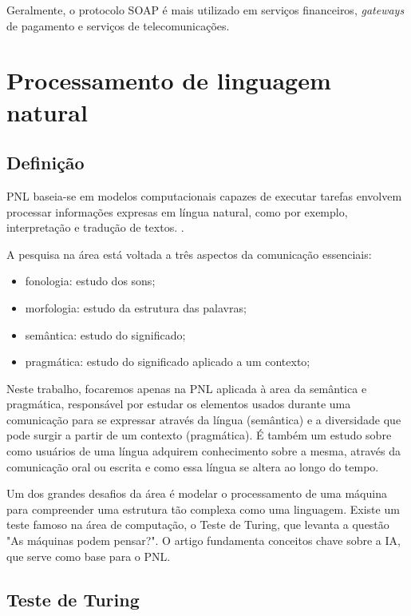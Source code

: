 Geralmente, o protocolo SOAP é mais utilizado em serviços financeiros, \textit{gateways} de pagamento e serviços de telecomunicações.

\section{Processamento de linguagem natural}\label{sec:pnl}

\subsection{Definição}

\ac{PNL} baseia-se em modelos computacionais capazes de executar tarefas envolvem processar informações expresas em língua natural, como por exemplo, interpretação e tradução de textos. \cite{covington1994natural}.

A pesquisa na área está voltada a três aspectos da comunicação essenciais:

\begin{itemize}
	\item fonologia: estudo dos sons;
	\item morfologia: estudo da estrutura das palavras;
	\item semântica: estudo do significado;
	\item pragmática: estudo do significado aplicado a um contexto;
\end{itemize}

Neste trabalho, focaremos apenas na PNL aplicada à area da semântica e pragmática, responsável por estudar os elementos usados durante uma comunicação para se expressar através da língua (semântica) e a diversidade que pode surgir a partir de um contexto (pragmática). É também um estudo sobre como usuários de uma língua adquirem conhecimento sobre a mesma, através da comunicação oral ou escrita e como essa língua se altera ao longo do tempo.

Um dos grandes desafios da área é modelar o processamento de uma máquina para compreender uma estrutura tão complexa como uma linguagem. Existe um teste famoso na área de computação, o Teste de Turing, que levanta a questão "As máquinas podem pensar?". O artigo fundamenta conceitos chave sobre a \ac{IA}, que serve como base para o PNL.

\subsection{Teste de Turing}

